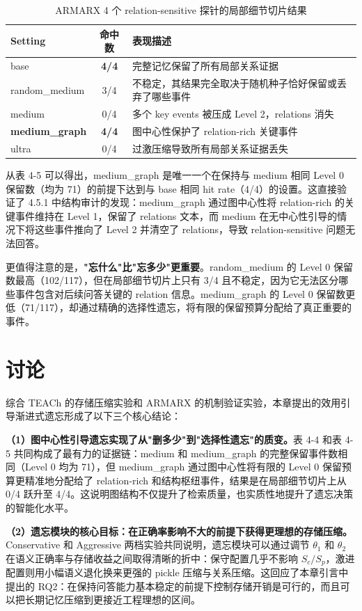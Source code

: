 \begin{table}[htbp]
\centering
\caption{ARMARX 4 个 relation-sensitive 探针的局部细节切片结果}
\label{tab:4-5}
\begin{tabular}{lcp{8cm}}
\toprule
Setting & 命中数 & 表现描述 \\
\midrule
base & \textbf{4/4} & 完整记忆保留了所有局部关系证据 \\
random\_medium & 3/4 & 不稳定，其结果完全取决于随机种子恰好保留或丢弃了哪些事件 \\
medium & 0/4 & 多个 key events 被压成 Level 2，relations 消失 \\
\textbf{medium\_graph} & \textbf{4/4} & 图中心性保护了 relation-rich 关键事件 \\
ultra & 0/4 & 过激压缩导致所有局部关系证据丢失 \\
\bottomrule
\end{tabular}
\end{table}

从表 4-5 可以得出，medium\_graph 是唯一一个在保持与 medium 相同 Level 0 保留数（均为 71）的前提下达到与 base 相同 hit rate（4/4）的设置。这直接验证了 4.5.1 中结构审计的发现：medium\_graph 通过图中心性将 relation-rich 的关键事件维持在 Level 1，保留了 relations 文本，而 medium 在无中心性引导的情况下将这些事件推向了 Level 2 并清空了 relations，导致 relation-sensitive 问题无法回答。

更值得注意的是，\textbf{"忘什么"比"忘多少"更重要}。random\_medium 的 Level 0 保留数最高（102/117），但在局部细节切片上只有 3/4 且不稳定，因为它无法区分哪些事件包含对后续问答关键的 relation 信息。medium\_graph 的 Level 0 保留数更低（71/117），却通过精确的选择性遗忘，将有限的保留预算分配给了真正重要的事件。

\section{讨论}

综合 TEACh 的存储压缩实验和 ARMARX 的机制验证实验，本章提出的效用引导渐进式遗忘形成了以下三个核心结论：

\textbf{（1）图中心性引导遗忘实现了从"删多少"到"选择性遗忘"的质变。}表 4-4 和表 4-5 共同构成了最有力的证据链：medium 和 medium\_graph 的完整保留事件数相同（Level 0 均为 71），但 medium\_graph 通过图中心性将有限的 Level 0 保留预算更精准地分配给了 relation-rich 和结构枢纽事件，结果是在局部细节切片上从 0/4 跃升至 4/4。这说明图结构不仅提升了检索质量，也实质性地提升了遗忘决策的智能化水平。

\textbf{（2）遗忘模块的核心目标：在正确率影响不大的前提下获得更理想的存储压缩。}Conservative 和 Aggressive 两档实验共同说明，遗忘模块可以通过调节 $\theta_1$ 和 $\theta_2$ 在语义正确率与存储收益之间取得清晰的折中：保守配置几乎不影响 $S_c/S_p$，激进配置则用小幅语义退化换来更强的 pickle 压缩与关系压缩。这回应了本章引言中提出的 RQ2：在保持问答能力基本稳定的前提下控制存储开销是可行的，而且可以把长期记忆压缩到更接近工程理想的区间。

